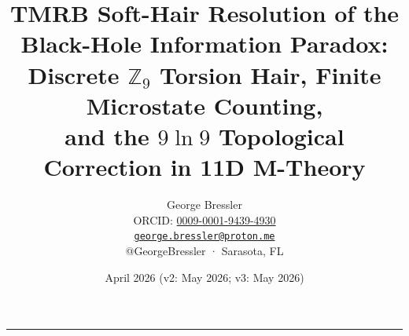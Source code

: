 \documentclass[11pt,a4paper]{article}
\begin{document}
\title{%
  \textbf{TMRB Soft-Hair Resolution of the Black-Hole Information Paradox:}\\[4pt]
  \textbf{Discrete $\mathbb{Z}_9$ Torsion Hair, Finite Microstate Counting,}\\[4pt]
  \textbf{and the $9\ln 9$ Topological Correction in 11D M-Theory}%
}
\author{%
  George Bressler\\[2pt]
  ORCID: \href{https://orcid.org/0009-0001-9439-4930}{0009-0001-9439-4930}\\
  \href{mailto:george.bressler@proton.me}{\texttt{george.bressler@proton.me}}\\
  @GeorgeBressler · Sarasota, FL
}
\date{April 2026 (v2: May 2026; v3: May 2026)}
\maketitle
\thispagestyle{fancy}

\vspace{4pt}
\begin{center}
{\color{gold}\rule{0.38\textwidth}{0.4pt}}
\end{center}
\vspace{2pt}
\end{document}
